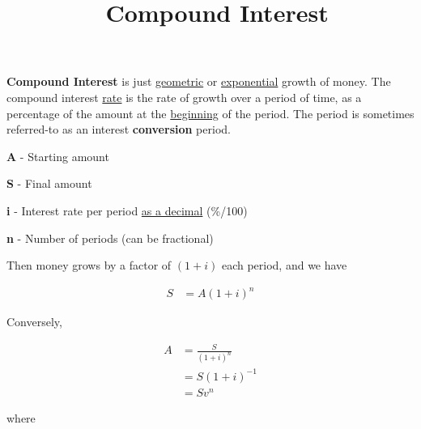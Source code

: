 \documentclass[12pt]{article}
\title{\normalfont\ Compound Interest} %
\author{} %
\date{}  %
\begin{document}
\maketitle %

\vspace{-1in}

\begin{flushleft}
    \textbf{Compound Interest} is just \underline{geometric} or \underline{exponential} growth 
    of money.  The compound interest \underline{rate} is the rate of growth over a period
    of time, as a percentage of the amount at the \underline{beginning} of the period.  The 
    period is sometimes referred-to as an interest \textbf{conversion} period.
\end{flushleft}
\vspace{.1in}

\begin{description}
    \item\textbf{A} - Starting amount
    \item\textbf{S} - Final amount
    \item\textbf{i} - Interest rate per period \underline{as a decimal} {(\%/100)}
    \item\textbf{n} - Number of periods (can be fractional)
\end{description}
\vspace{.1in}

\begin{flushleft}
    Then money grows by a factor of $(1+i)$ each period, and we have
\end{flushleft}
\vspace{-.1in}

\begin{align*}
    S & = A(1 + i)^n
\end{align*}
\vspace{-.1in}

\begin{flushleft}
    Conversely,
\end{flushleft}
\vspace{-.1in}

\begin{align*}
    A & = \frac{S}{(1 + i)^n} \\
      & = S(1+i)^{-1}         \\
      & = Sv^n
\end{align*}

\begin{flushleft}
    where
\end{flushleft}
\vspace{-.1in}
\end{document}
